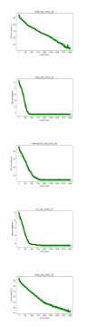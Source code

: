 \begin{figure}[H]
\begin{subfigure}
    \end{subfigure}
    \hfill
    \begin{subfigure}
        \centering
        \includegraphics[width=0.234\textwidth]{img/aggsf/ecoli_set_const_10_589741062_cost.png}
    \end{subfigure}
    \hfill
    \begin{subfigure}
        \centering
        \includegraphics[width=0.234\textwidth]{img/aggsf/rand_set_const_10_589741062_cost.png}
    \end{subfigure}
    \hfill
    \begin{subfigure}
        \centering
        \includegraphics[width=0.234\textwidth]{img/aggsf/newthyroid_set_const_10_589741062_cost.png}
    \end{subfigure}
    \hfill
    \begin{subfigure}
        \centering
        \includegraphics[width=0.234\textwidth]{img/aggsf/iris_set_const_10_277451237_cost.png}
    \end{subfigure}
    \hfill
    \begin{subfigure}
        \centering
        \includegraphics[width=0.234\textwidth]{img/aggsf/ecoli_set_const_10_277451237_cost.png}
    \end{subfigure}
    \hfill

\end{figure}
